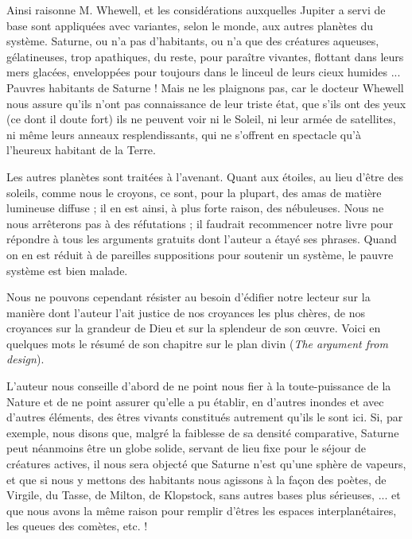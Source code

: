 \documentclass[a4paper, 11pt, oneside, landscape]{article}
\begin{document}
Ainsi raisonne M. Whewell, et les considérations auxquelles Jupiter a servi de base sont appliquées avec variantes, selon le monde, aux autres planètes du système. Saturne, ou n'a pas d'habitants, ou n'a que des créatures aqueuses, gélatineuses, trop apathiques, du reste, pour paraître vivantes, flottant dans leurs mers glacées, enveloppées pour toujours dans le linceul de leurs cieux humides ... Pauvres habitants de Saturne ! Mais ne les plaignons pas, car le docteur Whewell nous assure qu'ils n'ont pas connaissance de leur triste état, que s'ils ont des yeux (ce dont il doute fort) ils ne peuvent voir ni le Soleil, ni leur armée de satellites, ni même leurs anneaux resplendissants, qui ne s'offrent en spectacle qu'à l'heureux habitant de la Terre.

Les autres planètes sont traitées à l'avenant. Quant aux étoiles, au lieu d'être des soleils, comme nous le croyons, ce sont, pour la plupart, des amas de matière lumineuse diffuse ; il en est ainsi, à plus forte raison, des nébuleuses. Nous ne nous arrêterons pas à des réfutations ; il faudrait recommencer notre livre pour répondre à tous les arguments gratuits dont l'auteur a étayé ses phrases. Quand on en est réduit à de pareilles suppositions pour soutenir un système, le pauvre système est bien malade.

Nous ne pouvons cependant résister au besoin d'édifier notre lecteur sur la manière dont l'auteur l'ait justice de nos croyances les plus chères, de nos croyances sur la grandeur de Dieu et sur la splendeur de son œuvre. Voici en quelques mots le résumé de son chapitre sur le plan divin (\emph{The argument from design}).

L'auteur nous conseille d'abord de ne point nous fier à la toute-puissance de la Nature et de ne point assurer qu'elle a pu établir, en d'autres inondes et avec d'autres éléments, des êtres vivants constitués autrement qu'ils le sont ici. Si, par exemple, nous disons que, malgré la faiblesse de sa densité comparative, Saturne peut néanmoins être un globe solide, servant de lieu fixe pour le séjour de créatures actives, il nous sera objecté que Saturne n'est qu'une sphère de vapeurs, et que si nous y mettons des habitants nous agissons à la façon des poètes, de Virgile, du Tasse, de Milton, de Klopstock, sans autres bases plus sérieuses, ... et que nous avons la même raison pour remplir d'êtres les espaces interplanétaires, les queues des comètes, etc. !
\end{document}
